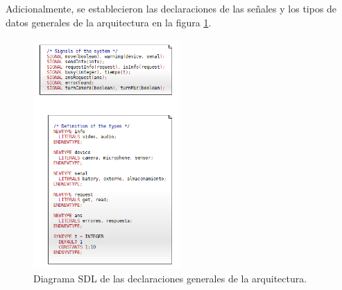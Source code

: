 \pagebreak

Adicionalmente, se establecieron las declaraciones de las señales y los tipos de datos generales de la arquitectura en la figura \ref{DeclaracionesSDL}.

\begin{figure}[h]
    \centering
    \includegraphics[width=0.5\textwidth]{images/Declaracionesx.png}
    \caption{Diagrama SDL de las declaraciones generales de la arquitectura.}
    \label{DeclaracionesSDL}
\end{figure}

\pagebreak

